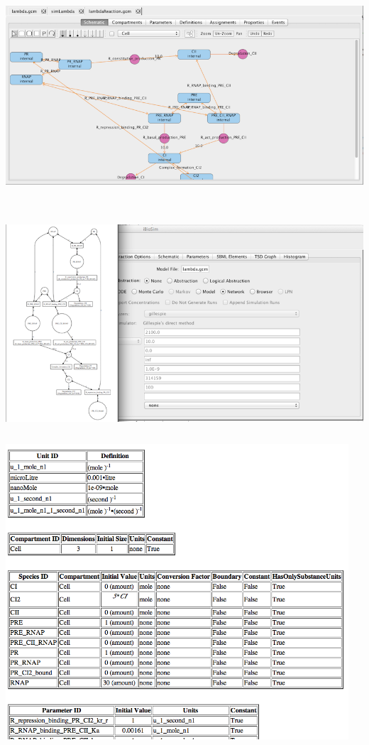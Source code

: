 \documentclass[titlepage,11pt]{article}
\begin{document}
\begin{center}
\includegraphics[height=80mm]{screenshots/reactionModel}
\end{center}

\begin{center}
\includegraphics[height=80mm]{screenshots/viewNetwork}
\end{center}

\begin{center}
\includegraphics[height=110mm]{screenshots/viewBrowser}
\end{center}
\end{document}
